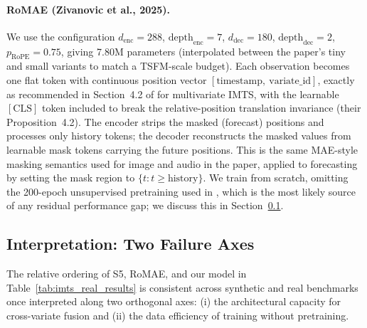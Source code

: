 \paragraph{RoMAE (Zivanovic et al., 2025).}
We use the configuration $d_{\text{enc}}{=}288$, $\text{depth}_{\text{enc}}{=}7$,
$d_{\text{dec}}{=}180$, $\text{depth}_{\text{dec}}{=}2$, $p_{\text{RoPE}}{=}0.75$,
giving 7.80M parameters (interpolated between the paper's tiny and small
variants to match a TSFM-scale budget). Each observation becomes one flat
token with continuous position vector $[\text{timestamp},\ \text{variate\_id}]$,
exactly as recommended in Section~4.2 of \citet{zivanovic2025rotary} for
multivariate IMTS, with the learnable $[\text{CLS}]$ token included to break
the relative-position translation invariance (their Proposition~4.2). The
encoder strips the masked (forecast) positions and processes only history
tokens; the decoder reconstructs the masked values from learnable mask tokens
carrying the future positions. This is the same MAE-style masking semantics
used for image and audio in the paper, applied to forecasting by setting the
mask region to $\{t : t \geq \text{history}\}$. We train from scratch, omitting
the 200-epoch unsupervised pretraining used in \citet{zivanovic2025rotary},
which is the most likely source of any residual performance gap; we discuss
this in Section~\ref{sec:baselines_interpretation}.

\subsection{Interpretation: Two Failure Axes}
\label{sec:baselines_interpretation}

The relative ordering of S5, RoMAE, and our model in
Table~\ref{tab:imts_real_results} is consistent across synthetic and real
benchmarks once interpreted along two orthogonal axes: (i) the architectural
capacity for cross-variate fusion and (ii) the data efficiency of training
without pretraining.

